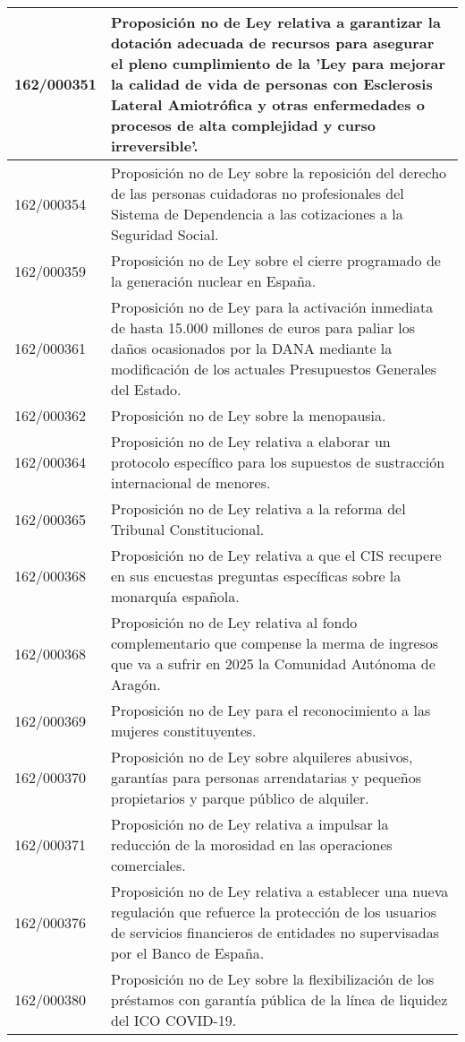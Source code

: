 {\begin{table}[H]
\begin{center}
\begin{tabularx}{\linewidth}{| l | X |}
\hline
162/000351 & Proposición no de Ley relativa a garantizar la dotación adecuada de recursos para asegurar el pleno cumplimiento de la 'Ley para mejorar la calidad de vida de personas con Esclerosis Lateral Amiotrófica y otras enfermedades o procesos de alta complejidad y curso irreversible'. \\
\hline
162/000354 & Proposición no de Ley sobre la reposición del derecho de las personas cuidadoras no profesionales del Sistema de Dependencia a las cotizaciones a la Seguridad Social. \\
\hline
162/000359 & Proposición no de Ley sobre el cierre programado de la generación nuclear en España. \\
\hline
162/000361 & Proposición no de Ley para la activación inmediata de hasta 15.000 millones de euros para paliar los daños ocasionados por la DANA mediante la modificación de los actuales Presupuestos Generales del Estado. \\
\hline
162/000362 & Proposición no de Ley sobre la menopausia. \\
\hline
162/000364 & Proposición no de Ley relativa a elaborar un protocolo específico para los supuestos de sustracción internacional de menores. \\
\hline
162/000365 & Proposición no de Ley relativa a la reforma del Tribunal Constitucional. \\
\hline
162/000368 & Proposición no de Ley relativa a que el CIS recupere en sus encuestas preguntas específicas sobre la monarquía española. \\
\hline
162/000368 & Proposición no de Ley relativa al fondo complementario que compense la merma de ingresos que va a sufrir en 2025 la Comunidad Autónoma de Aragón. \\
\hline
162/000369 & Proposición no de Ley para el reconocimiento a las mujeres constituyentes. \\
\hline
162/000370 & Proposición no de Ley sobre alquileres abusivos, garantías para personas arrendatarias y pequeños propietarios y parque público de alquiler. \\
\hline
162/000371 & Proposición no de Ley relativa a impulsar la reducción de la morosidad en las operaciones comerciales. \\
\hline
162/000376 & Proposición no de Ley relativa a establecer una nueva regulación que refuerce la protección de los usuarios de servicios financieros de entidades no supervisadas por el Banco de España. \\
\hline
162/000380 & Proposición no de Ley sobre la flexibilización de los préstamos con garantía pública de la línea de liquidez del ICO COVID-19. \\

\end{tabularx}
\end{center}
\end{table}}
